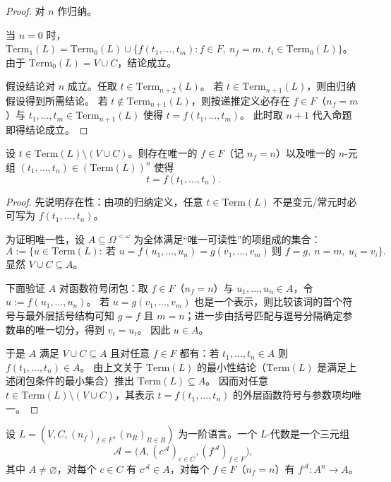 \documentclass[lang=cn,a4paper,newtx,section]{elegantbook}
\begin{document}
 \begin{proof}
 对 $n$ 作归纳。
 
 当 $n=0$ 时，$\mathrm{Term}_1(L)=\mathrm{Term}_0(L)\cup\{f(t_1,\dots,t_m): f\in F,\ n_f=m,\ t_i\in\mathrm{Term}_0(L)\}$。
 由于 $\mathrm{Term}_0(L)=V\cup C$，结论成立。
 
 假设结论对 $n$ 成立。任取 $t\in\mathrm{Term}_{n+2}(L)$。
 若 $t\in\mathrm{Term}_{n+1}(L)$，则由归纳假设得到所需结论。
 若 $t\notin\mathrm{Term}_{n+1}(L)$，则按递推定义必存在 $f\in F$（$n_f=m$）与 $t_1,\dots,t_m\in\mathrm{Term}_{n+1}(L)$ 使得 $t=f(t_1,\dots,t_m)$。
 此时取 $n+1$ 代入命题即得结论成立。
 \end{proof}
 
 \begin{lemma}
 设 $t\in\mathrm{Term}(L)\setminus (V\cup C)$。则存在唯一的 $f\in F$（记 $n_f=n$）以及唯一的 $n$-元组 $(t_1,\dots,t_n)\in(\mathrm{Term}(L))^{n}$ 使得
 \[
   t=f(t_1,\dots,t_n).
 \]
 \end{lemma}
 
 \begin{proof}
 先说明存在性：由项的归纳定义，任意 $t\in\mathrm{Term}(L)$ 不是变元/常元时必可写为 $f(t_1,\dots,t_n)$。
 
 为证明唯一性，设 $A\subseteq\Omega^{<\omega}$ 为全体满足“唯一可读性”的项组成的集合：
 \[
   A:=\{u\in\mathrm{Term}(L):\ \text{若 }u=f(u_1,\dots,u_n)=g(v_1,\dots,v_m)\ \text{则 }f=g,\ n=m,\ u_i=v_i\}.
 \]
 显然 $V\cup C\subseteq A$。
 
 下面验证 $A$ 对函数符号闭包：取 $f\in F$（$n_f=n$）与 $u_1,\dots,u_n\in A$，令 $u:=f(u_1,\dots,u_n)$。
 若 $u=g(v_1,\dots,v_m)$ 也是一个表示，则比较该词的首个符号与最外层括号结构可知 $g=f$ 且 $m=n$；进一步由括号匹配与逗号分隔确定参数串的唯一切分，得到 $v_i=u_i$。
 因此 $u\in A$。
 
 于是 $A$ 满足 $V\cup C\subseteq A$ 且对任意 $f\in F$ 都有：若 $t_1,\dots,t_n\in A$ 则 $f(t_1,\dots,t_n)\in A$。
 由上文关于 $\mathrm{Term}(L)$ 的最小性结论（$\mathrm{Term}(L)$ 是满足上述闭包条件的最小集合）推出 $\mathrm{Term}(L)\subseteq A$。
 因而对任意 $t\in\mathrm{Term}(L)\setminus (V\cup C)$，其表示 $t=f(t_1,\dots,t_n)$ 的外层函数符号与参数项均唯一。
 \end{proof}

\begin{definition}[$L$-代数]
设 $L=(V,C,(n_f)_{f\in F},(n_R)_{R\in R})$ 为一阶语言。一个 $L$-代数是一个三元组
\[
  \mathcal A=\bigl(A,(c^{\mathcal A})_{c\in C},(f^{\mathcal A})_{f\in F}\bigr),
\]
其中 $A\neq\varnothing$，对每个 $c\in C$ 有 $c^{\mathcal A}\in A$，对每个 $f\in F$（$n_f=n$）有 $f^{\mathcal A}:A^{n}\to A$。
\end{definition}
\end{document}
